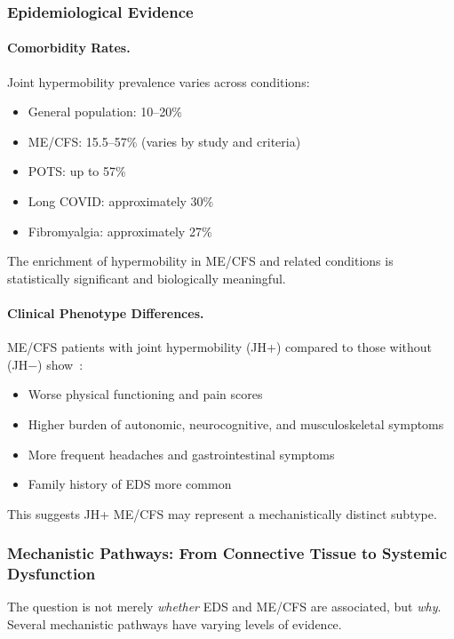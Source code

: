 \subsubsection{Epidemiological Evidence}

\paragraph{Comorbidity Rates.}
Joint hypermobility prevalence varies across conditions:
\begin{itemize}
    \item General population: 10--20\%
    \item ME/CFS: 15.5--57\% (varies by study and criteria)
    \item POTS: up to 57\%
    \item Long COVID: approximately 30\%
    \item Fibromyalgia: approximately 27\%
\end{itemize}
The enrichment of hypermobility in ME/CFS and related conditions is statistically significant and biologically meaningful.

\paragraph{Clinical Phenotype Differences.}
ME/CFS patients with joint hypermobility (JH+) compared to those without (JH$-$) show~\cite{Mudie2024hypermobility}:
\begin{itemize}
    \item Worse physical functioning and pain scores
    \item Higher burden of autonomic, neurocognitive, and musculoskeletal symptoms
    \item More frequent headaches and gastrointestinal symptoms
    \item Family history of EDS more common
\end{itemize}
This suggests JH+ ME/CFS may represent a mechanistically distinct subtype.

\subsubsection{Mechanistic Pathways: From Connective Tissue to Systemic Dysfunction}

The question is not merely \textit{whether} EDS and ME/CFS are associated, but \textit{why}. Several mechanistic pathways have varying levels of evidence.

